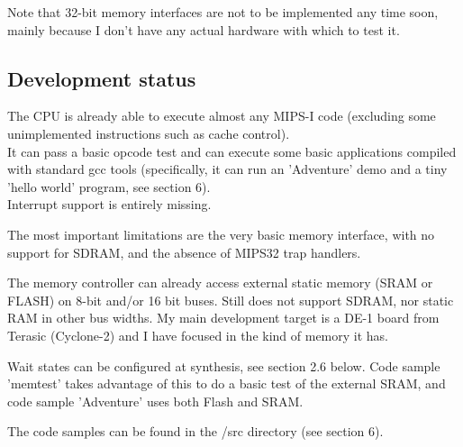 \documentclass[11pt]{article}
\begin{document}
    
    Note that 32-bit memory interfaces are not to be implemented any time soon, 
    mainly because I don't have any actual hardware with which to test it.
    

\subsection{Development status}
\label{status}

    The CPU is already able to execute almost any MIPS-I code (excluding some
    unimplemented instructions such as cache control).\\
    It can pass a basic opcode test and can execute some basic applications 
    compiled with standard gcc tools (specifically, it can run an 'Adventure' 
    demo and a tiny 'hello world' program, see section 6).\\
    
    Interrupt support is entirely missing.
    
    The most important limitations are the very basic memory interface, with
    no support for SDRAM, and the absence of MIPS32 trap handlers.
    
    The memory controller can already access external static memory (SRAM or 
    FLASH) on 8-bit and/or 16 bit buses. Still does not support SDRAM, nor 
    static RAM in other bus widths.
    My main development target is a DE-1 board from Terasic (Cyclone-2) and I 
    have focused in the kind of memory it has.
    
    Wait states can be configured at synthesis, see section 2.6 below.
    Code sample 'memtest' takes advantage of this to do a basic test of the
    external SRAM, and code sample 'Adventure' uses both Flash and SRAM.
    

    The code samples can be found in the /src directory (see section 6).
\end{document}
